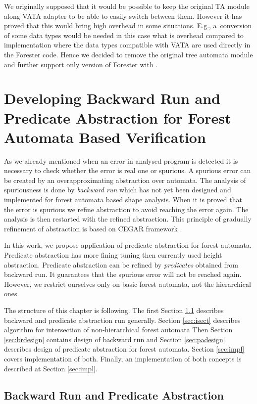 We originally supposed that it would be possible to keep the original TA module along VATA adapter
to be able to easily switch between them.
However it has proved that this would bring high overhead in some situations.
E.g., a~conversion of some data types would be needed in this case
what is overhead compared to implementation where the data types compatible
with VATA are used directly in the Forester code.
Hence we decided to remove the original tree automata module and further support only version of Forester with \vata.

\chapter{Developing Backward Run and Predicate Abstraction for Forest Automata Based Verification}
\label{ch:backward}

As we already mentioned when an error in analysed program is detected
it is necessary to check whether the error is real one or spurious.
A spurious error can be created by an overapproximating abstraction over automata.
The analysis of spuriousness is done by \emph{backward run} which has not
yet been designed and implemented for forest automata based shape analysis.
When it is proved that the error is spurious we refine abstraction to avoid
reaching the error again.
The analysis is then restarted with the refined abstraction.
This principle of gradually refinement of abstraction is based on CEGAR framework \cite{cegar}.

In this work, we propose application of predicate abstraction \cite{artmc} for forest automata.
Predicate abstraction has more fining tuning then currently used height abstraction.
Predicate abstraction can be refined by \emph{predicates} obtained from backward run.
It guarantees that the spurious error will not be reached again.
However, we restrict ourselves only on basic forest automata, not the hierarchical ones.

The structure of this chapter is following.
The first Section \ref{sec:br} describes backward and predicate abstraction run generally.
Section \ref{sec:isect} describes algorithm for intersection of non-hierarchical forest automata
Then Section \ref{sec:brdesign} contains design of backward run
and Section \ref{sec:padesign} describes design of predicate abstraction for forest automata.
Section \ref{sec:impl} covers implementation of both.
Finally, an implementation of both concepts is described at Section \ref{sec:impl}.

\section{Backward Run and Predicate Abstraction}
\label{sec:br}

